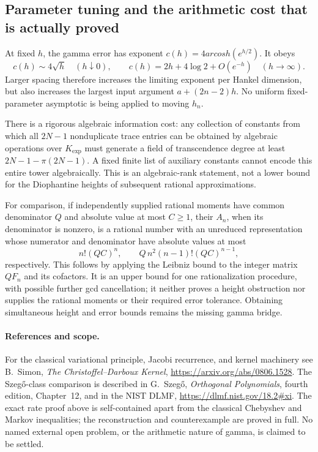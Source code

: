 \documentclass[11pt,a4paper]{article}
\theoremstyle{definition}
\theoremstyle{remark}
\theoremstyle{plain}
\numberwithin{equation}{section}
\def\operatorname#1{#1}\def\mathrm#1{#1}}
\begin{document}
\subsection{Parameter tuning and the arithmetic cost that is actually proved}

At fixed $h$, the gamma error has exponent
$c(h)=4\operatorname{arcosh}(e^{h/2})$. It obeys
\[
 c(h)\sim4\sqrt h\quad(h\downarrow0),\qquad
 c(h)=2h+4\log2+O(e^{-h})\quad(h\to\infty).
\]
Larger spacing therefore increases the limiting exponent per Hankel
dimension, but
also increases the largest input argument $a+(2n-2)h$. No uniform
fixed-parameter asymptotic is being applied to moving $h_n$.

There is a rigorous algebraic information cost: any collection of
constants from which all $2N-1$ nonduplicate trace entries can be
obtained by algebraic operations over $K_{\exp}$ must generate a field
of transcendence degree at least $2N-1-\pi(2N-1)$. A fixed finite list of
auxiliary constants cannot encode this entire tower algebraically.
This is an algebraic-rank statement, not a lower bound for the
Diophantine heights of subsequent rational approximations.

For comparison, if independently supplied rational moments have common
denominator $Q$ and absolute value at most $C\ge1$, their $A_n$, when its denominator is nonzero, is a
rational number with an unreduced representation whose numerator and
denominator have absolute values at most
\[
 n! (QC)^n,\qquad Q\,n^2(n-1)!(QC)^{n-1},
\]
respectively. This follows by applying the Leibniz bound to the integer
matrix $QF_n$ and its cofactors. It is an upper bound for one
rationalization procedure, with possible further gcd cancellation;
it neither proves a height obstruction nor supplies the rational
moments or their required error tolerance. Obtaining simultaneous
height and error bounds remains the missing gamma bridge.

\paragraph{References and scope.}
For the classical variational principle, Jacobi recurrence, and kernel
machinery see B.~Simon, \emph{The Christoffel--Darboux Kernel},
\url{https://arxiv.org/abs/0806.1528}.  The Szeg\H{o}-class comparison is
described in G.~Szeg\H{o}, \emph{Orthogonal Polynomials}, fourth edition,
Chapter~12, and in the NIST DLMF,
\url{https://dlmf.nist.gov/18.2#xi}.  The exact rate proof above is
self-contained apart from the classical Chebyshev and Markov
inequalities; the reconstruction and counterexample are proved in full.
No named external open problem, or the arithmetic nature of gamma, is
claimed to be settled.
\end{document}
